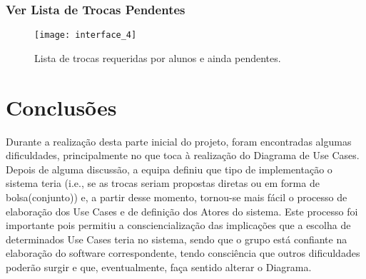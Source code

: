 \documentclass[a4paper]{article}
\begin{document}
\subsubsection{Ver Lista de Trocas Pendentes}
\begin{figure}[H]
\centering
\texttt{[image: interface\_4]}
\caption{Lista de trocas requeridas por alunos e ainda pendentes.}
\label{fig:18}
\end{figure}



\pagebreak
\section{Conclusões}
\hspace{3mm}Durante a realização desta parte inicial do projeto, foram encontradas algumas dificuldades, principalmente no que toca à realização do Diagrama de Use Cases. Depois de alguma discussão, a equipa definiu que tipo de implementação o sistema teria (i.e., se as trocas seriam propostas diretas ou em forma de bolsa(conjunto)) e, a partir desse momento, tornou-se mais fácil o processo de elaboração dos Use Cases e de definição dos Atores do sistema. Este processo foi importante pois permitiu a consciencialização das implicações que a escolha de determinados Use Cases teria no sistema, sendo que o grupo está confiante na elaboração do software correspondente, tendo consciência que outros dificuldades poderão surgir e que, eventualmente, faça sentido alterar o Diagrama.
\label{sec:4}

\hspace{3mm}
\end{document}
